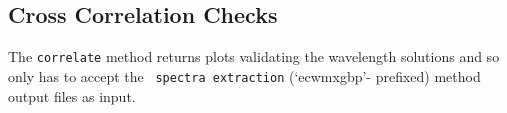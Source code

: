 




\subsection{Cross Correlation Checks} \label{subsec:test_corr}

The \texttt{correlate} method returns plots validating the wavelength solutions and so only has to accept the \polsalt\ \texttt{spectra extraction} (`ecwmxgbp'- prefixed) method output files as input.


